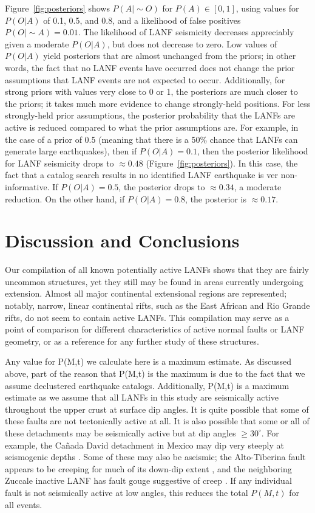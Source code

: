 \documentclass[draft,grl]{AGUTeX}
\begin{document}
\begin{article}
Figure~\ref{fig:posteriors} shows $P(A|\sim O)$ for $P(A) \in [0,1]$, using
values for $P(O|A)$ of 0.1, 0.5, and 0.8, and a likelihood of false positives
$P(O|\sim A)= 0.01$. The likelihood of LANF seismicity decreases appreciably
given a moderate $P(O|A)$, but does not decrease to zero. Low values of
$P(O|A)$ yield posteriors that are almost unchanged from the priors; in other
words, the fact that no LANF events have occurred does not change the prior
assumptions that LANF events are not expected to occur.  Additionally, for
strong priors with values very close to 0 or 1, the posteriors are much closer
to the priors; it takes much more evidence to change strongly-held positions.
For less strongly-held prior assumptions, the posterior probability that the
LANFs are active is reduced compared to what the prior assumptions are. For
example, in the case of a prior of 0.5 (meaning that there is a 50\% chance
that LANFs can generate large earthquakes), then if $P(O|A)=0.1$, then the
posterior likelihood for LANF seismicity drops to $\approx 0.48$
(Figure~\ref{fig:posteriors}). In this case, the fact that a catalog search
results in no identified LANF earthquake is ver non-informative. If
$P(O|A)=0.5$, the posterior drops to $\approx 0.34$, a moderate reduction.  On
the other hand, if $P(O|A)=0.8$, the posterior is $\approx 0.17$.

\section{Discussion and Conclusions}

Our compilation of all known potentially active LANFs shows that they are
fairly uncommon structures, yet they still may be found in areas currently
undergoing extension. Almost all major continental extensional regions are
represented; notably, narrow, linear continental rifts, such as the East
African and Rio Grande rifts, do not seem to contain active LANFs.  This
compilation may serve as a point of comparison for different characteristics of
active normal faults or LANF geometry, or as a reference for any further
study of these structures.

Any value for P(M,t) we calculate here is a maximum estimate. As discussed
above, part of the reason that P(M,t) is the maximum is due to the fact that we
assume declustered earthquake catalogs. Additionally, P(M,t) is a maximum
estimate as we assume that all LANFs in this study are seismically active
throughout the upper crust at surface dip angles.  It is quite possible that
some of these faults are not tectonically active at all. It is also possible
that some or all of these detachments may be seismically active but at dip
angles $\ge30^\circ$.  For example, the Ca\~nada David detachment in Mexico may
dip very steeply at seismogenic depths \citep{fletcherspelz2009}.  Some of
these may also be aseismic; the Alto-Tiberina fault appears to be creeping for
much of its down-dip extent \citep{hreinsdottir2009altotib}, and the
neighboring Zuccale inactive LANF has fault gouge suggestive of creep
\citep{collettiniholdsworth2004}. If any individual fault is not seismically
active at low angles, this reduces the total $P(M, t)$ for all events.


\end{article}
\end{document}
